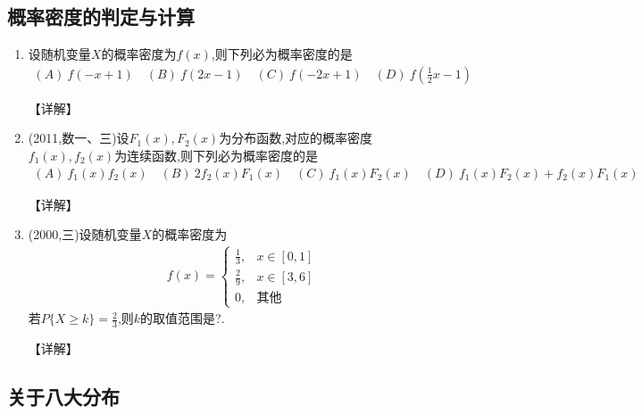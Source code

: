 \documentclass[12pt, a4paper, oneside, UTF8]{ctexbook}
\begin{document}
\subsection{概率密度的判定与计算}

\begin{enumerate}[label=\arabic*.,start=3]
    \item 设随机变量$X$的概率密度为$f(x)$,则下列必为概率密度的是
    \begin{align*}
        (A)\ f(-x+1) \quad (B)\ f(2x-1) \quad (C)\ f(-2x+1) \quad (D)\ f\left(\frac{1}{2}x-1\right)
    \end{align*}
    
    \begin{solution}
    【详解】
    \end{solution}
    
    \item (2011,数一、三)设$F_1(x),F_2(x)$为分布函数,对应的概率密度$f_1(x),f_2(x)$为连续函数,则下列必为概率密度的是
    \begin{align*}
        (A)\ f_1(x)f_2(x) \quad (B)\ 2f_2(x)F_1(x) \quad (C)\ f_1(x)F_2(x) \quad (D)\ f_1(x)F_2(x)+f_2(x)F_1(x)
    \end{align*}
    
    \begin{solution}
    【详解】
    \end{solution}
    
    \item (2000,三)设随机变量$X$的概率密度为
    \begin{align*}
        f(x)=\begin{cases}
            \frac{1}{3}, & x\in[0,1] \\
            \frac{2}{9}, & x\in[3,6] \\
            0, & \text{其他}
        \end{cases}
    \end{align*}
    若$P\{X\geq k\}=\frac{2}{3}$,则$k$的取值范围是?.
    
    \begin{solution}
    【详解】
    \end{solution}
\end{enumerate}

\subsection{关于八大分布}
\end{document}
